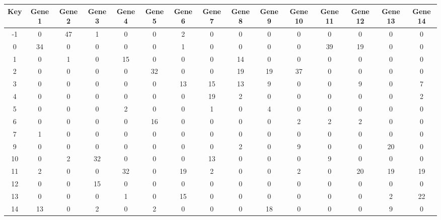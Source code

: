 \begin{tabular}{|c|c|c|c|c|c|c|c|c|c|c|c|c|c|c|}
\hline
Key & Gene 1 & Gene 2 & Gene 3 & Gene 4 & Gene 5 & Gene 6 & Gene 7 & Gene 8 & Gene 9 & Gene 10 & Gene 11 & Gene 12 & Gene 13 & Gene 14 \\
\hline
-1 & 0 & 47 & 1 & 0 & 0 & 2 & 0 & 0 & 0 & 0 & 0 & 0 & 0 & 0 \\
0 & 34 & 0 & 0 & 0 & 0 & 1 & 0 & 0 & 0 & 0 & 39 & 19 & 0 & 0 \\
1 & 0 & 1 & 0 & 15 & 0 & 0 & 0 & 14 & 0 & 0 & 0 & 0 & 0 & 0 \\
2 & 0 & 0 & 0 & 0 & 32 & 0 & 0 & 19 & 19 & 37 & 0 & 0 & 0 & 0 \\
3 & 0 & 0 & 0 & 0 & 0 & 13 & 15 & 13 & 9 & 0 & 0 & 9 & 0 & 7 \\
4 & 0 & 0 & 0 & 0 & 0 & 0 & 19 & 2 & 0 & 0 & 0 & 0 & 0 & 2 \\
5 & 0 & 0 & 0 & 2 & 0 & 0 & 1 & 0 & 4 & 0 & 0 & 0 & 0 & 0 \\
6 & 0 & 0 & 0 & 0 & 16 & 0 & 0 & 0 & 0 & 2 & 2 & 2 & 0 & 0 \\
7 & 1 & 0 & 0 & 0 & 0 & 0 & 0 & 0 & 0 & 0 & 0 & 0 & 0 & 0 \\
9 & 0 & 0 & 0 & 0 & 0 & 0 & 0 & 2 & 0 & 9 & 0 & 0 & 20 & 0 \\
10 & 0 & 2 & 32 & 0 & 0 & 0 & 13 & 0 & 0 & 0 & 9 & 0 & 0 & 0 \\
11 & 2 & 0 & 0 & 32 & 0 & 19 & 2 & 0 & 0 & 2 & 0 & 20 & 19 & 19 \\
12 & 0 & 0 & 15 & 0 & 0 & 0 & 0 & 0 & 0 & 0 & 0 & 0 & 0 & 0 \\
13 & 0 & 0 & 0 & 1 & 0 & 15 & 0 & 0 & 0 & 0 & 0 & 0 & 2 & 22 \\
14 & 13 & 0 & 2 & 0 & 2 & 0 & 0 & 0 & 18 & 0 & 0 & 0 & 9 & 0 \\
\hline
\end{tabular}